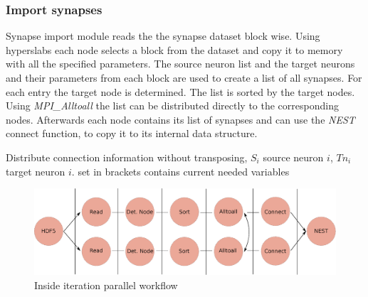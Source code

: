 \subsubsection{Import synapses}
Synapse import module reads the the synapse dataset block wise. Using hyperslabs each node selects a block from the
dataset and copy it to memory with all the specified parameters.
The source neuron list and the target neurons and their parameters from each block are used to create a list of all synapses.
For each entry the target node is determined.
The list is sorted by the target nodes.
Using \emph{MPI\_Alltoall} the list can be distributed directly to the corresponding nodes.
Afterwards each node contains its list of synapses and can use the \emph{NEST} connect function, to copy it to its internal data structure.
\begin{algorithm}
\label{alg2}
\caption{Distribute connection information without transposing, $S_i$ source neuron $i$, $Tn_i$ target neuron $i$.
	set in brackets contains current needed variables}
\end{algorithm}



\begin{figure}[ht!]
\centering
\includegraphics[scale=0.4]{pictures/Connect_inside_iteration.eps}
\caption{Inside iteration parallel workflow}
\label{Algparts}
\end{figure}

